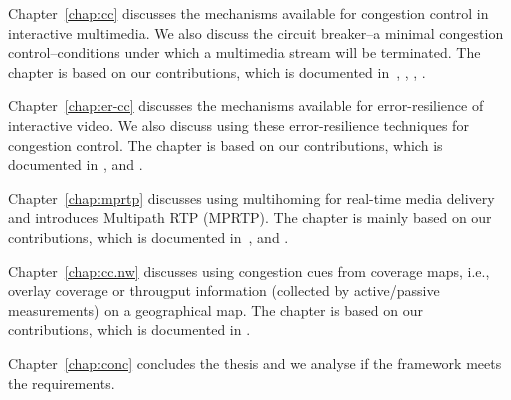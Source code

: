 Chapter~\ref{chap:cc} discusses the mechanisms available for congestion control
in interactive multimedia. We also discuss the circuit breaker--a minimal
congestion control--conditions under which a multimedia stream will be
terminated. The chapter is based on our contributions, which is documented
in~\cite{draft.rtp.cb, Singh:control.loops.api}, ,
, .


Chapter~\ref{chap:er-cc} discusses the mechanisms available for error-resilience of
interactive video. We also discuss using these error-resilience techniques for
congestion control. The chapter is based on our contributions, which is
documented in , and .



Chapter~\ref{chap:mprtp} discusses using multihoming for real-time media delivery
and introduces Multipath RTP (MPRTP). The chapter is mainly based on our
contributions, which is documented in~\cite{draft.mprtp, draft.mprtp.sdp,
Globisch:AsymGrpComm, draft.rtcp.overlay}, and .


Chapter~\ref{chap:cc.nw} discusses using congestion cues from coverage maps, i.e.,
overlay coverage or througput information (collected by active/passive
measurements) on a geographical map. The chapter is based on our
contributions,  which is documented in .


Chapter~\ref{chap:conc} concludes the thesis and we analyse if the framework meets
the requirements.

